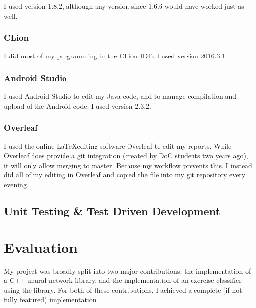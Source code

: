 \documentclass[a4paper]{article}
\begin{document}
I used version 1.8.2, although any version since 1.6.6 would have worked just as well.

\subsubsection{CLion}

I did most of my programming in the CLion\cite{ppref19} IDE. I used version 2016.3.1 

\subsubsection{Android Studio}

I used Android Studio\cite{ppref20} to edit my Java code, and to manage compilation and upload of the Android code. I used version 2.3.2.

\subsubsection{Overleaf}%
\label{subsubsec:pp_ts_overleaf}

I used the online \LaTeX editing software Overleaf\cite{ppref21} to edit my reports. While Overleaf does provide a git integration (created by DoC students two years ago), it will only allow merging to master. Because my workflow prevents this, I instead did all of my editing in Overleaf and copied the file into my git repository every evening.

\subsection{Unit Testing \& Test Driven Development}%
\label{subsec:pp_testing}


\newpage
\section{Evaluation}
\label{sec:ev}

My project was broadly split into two major contributions: the implementation of a C++ neural network library, and the implementation of an exercise classifier using the library. For both of these contributions, I achieved a complete (if not fully featured) implementation.
\end{document}
